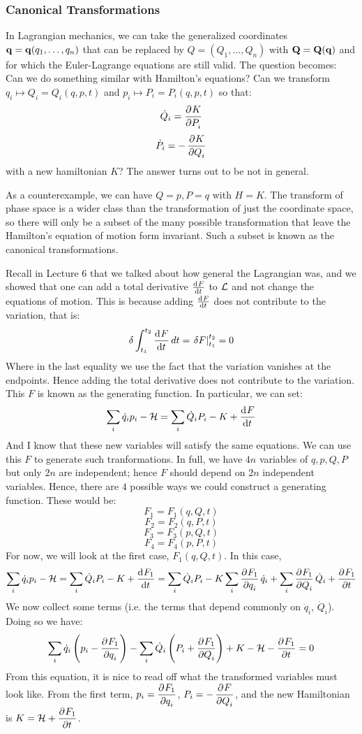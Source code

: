\documentclass[../PHYS306Notes.tex]{subfiles}
\begin{document}
\subsubsection{Canonical Transformations}
In Lagrangian mechanics, we can take the generalized coordinates $\mathbf{q} = \mathbf{q}(q_1, \ldots, q_n)$ that can be replaced by $Q = (Q_1, \ldots, Q_n)$ with $\mathbf{Q} = \mathbf{Q}(\mathbf{q})$ and for which the Euler-Lagrange equations are still valid. The question becomes: Can we do something similar with Hamilton's equations? Can we transform $q_i \mapsto Q_i = Q_i(q, p, t)$ and $p_i \mapsto P_i = P_i(q, p, t)$ so that:
\[\dot{Q}_i = \dpd{K}{P_i}\]
\[\dot{P}_i = -\dpd{K}{Q_i}\]
with a new hamiltonian $K$? The answer turns out to be not in general.

\noindent As a counterexample, we can have $Q = p, P = q$ with $H = K$. The transform of phase space is a wider class than the transformation of just the coordinate space, so there will only be a subset of the many possible transformation that leave the Hamilton's equation of motion form invariant. Such a subset is known as the canonical transformations. 

\noindent Recall in Lecture 6 that we talked about how general the Lagrangian was, and we showed that one can add a total derivative $\od{F}{t}$ to $\mathcal{L}$ and not change the equations of motion. This is because adding $\od{F}{t}$ does not contribute to the variation, that is:
\[\delta \int_{t_1}^{t_2} \dod{F}{t}dt = \left. \delta F\right|_{t_1}^{t_2} = 0\]
Where in the last equality we use the fact that the variation vanishes at the endpoints. Hence adding the total derivative does not contribute to the variation. This $F$ is known as the generating function. In particular, we can set:
\[\sum_i \dot{q}_i p_i - \HH = \sum_i\dot{Q}_iP_i - K + \dod{F}{t}\]
And I know that these new variables will satisfy the same equations. We can use this $F$ to generate such tranformations. In full, we have $4n$ variables of $q, p, Q, P$ but only $2n$ are independent; hence $F$ should depend on $2n$ independent variables. Hence, there are $4$ possible ways we could construct a generating function. These would be:
\[F_1 = F_1(q, Q, t)\]
\[F_2 = F_2(q, P, t)\]
\[F_3 = F_3(p, Q, t)\]
\[F_4 = F_4(p, P, t)\]
For now, we will look at the first case, $F_1(q, Q, t)$. In this case, 
\[\sum_i \dot{q}_i p_i - \HH = \sum_i \dot{Q}_i P_i - K + \dod{F_1}{t} = \sum_{i}\dot{Q}_iP_i - K \sum_i\dpd{F_1}{q_i}\dot{q}_i + \sum_i \dpd{F_1}{Q_i}\dot{Q}_i + \dpd{F_1}{t}\]
We now collect some terms (i.e. the terms that depend commonly on $\dot{q}_i$, $\dot{Q}_i$). Doing so we have:
\[\sum_i \dot{q}_i\left(p_i - \dpd{F_1}{q_i}\right) - \sum_i\dot{Q}_i\left(P_i + \dpd{F_1}{Q_i}\right) + K - \HH - \dpd{F_1}{t} = 0\]
From this equation, it is nice to read off what the transformed variables must look like. From the first term, $p_i = \dpd{F_1}{q_i}$, $P_i = -\dpd{F}{Q_i}$, and the new Hamiltonian is $K = \HH + \dpd{F_1}{t}$.
\end{document}
